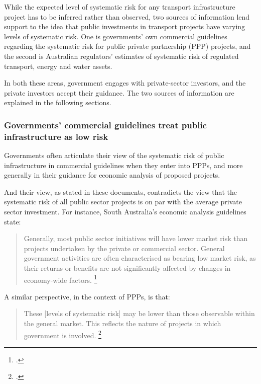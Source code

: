 \documentclass{grattan}
\begin{document}
While the expected level of systematic risk for any transport infrastructure project has to be inferred rather than observed, two sources of information lend support to the idea that public investments in transport projects have varying levels of systematic risk. One is governments' own commercial guidelines regarding the systematic risk for public private partnership (PPP) projects, and the second is Australian regulators' estimates of systematic risk of regulated transport, energy and water assets. 

In both these areas, government engages with private-sector investors, and the private investors accept their guidance. The two sources of information are explained in the following sections.

\subsubsection{Governments' commercial guidelines treat public infrastructure as low risk}
Governments often articulate their view of the systematic risk of public infrastructure in commercial guidelines when they enter into PPPs, and more generally in their guidance for economic analysis of proposed projects.

And their view, as stated in these documents, contradicts the view that the systematic risk of all public sector projects is on par with the average private sector investment. For instance, South Australia’s economic analysis guidelines state:
\begin{quote}\small
Generally, most public sector initiatives will have lower market risk than projects undertaken by the private or commercial sector. General government activities are often characterised as bearing low market risk, as their returns or benefits are not significantly affected by changes in economy-wide factors.%
    \footcite[][20]{Sth-Aust-2014-guidelines-for-economic-evaluation}
\end{quote}

A similar perspective, in the context of PPPs, is that: 
\begin{quote}\small
These [levels of systematic risk] may be lower than those observable within the general market. This reflects the nature of projects in which government is involved.%
    \footcite[][18]{Partnerships-Victoria-2003-discount-rate-guidelines}
\end{quote}
\end{document}
